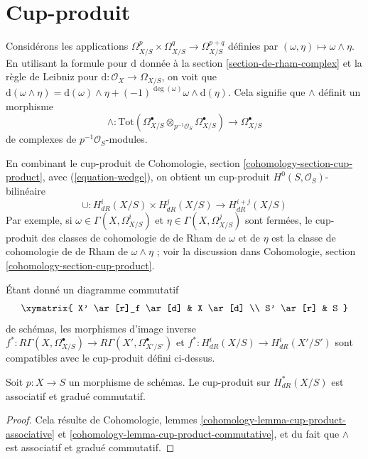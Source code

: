 \section{Cup-produit}
\label{section-cup-product}

\noindent
Considérons les applications
$\Omega^p_{X/S} \times \Omega^q_{X/S} \to \Omega^{p + q}_{X/S}$
définies par $(\omega , \eta) \longmapsto \omega \wedge \eta$.
En utilisant la formule pour $\text{d}$ donnée à la section \ref{section-de-rham-complex}
et la règle de Leibniz pour $\text{d} : \mathcal{O}_X \to \Omega_{X/S}$,
on voit que $\text{d}(\omega \wedge \eta) = \text{d}(\omega) \wedge \eta +
(-1)^{\deg(\omega)} \omega \wedge \text{d}(\eta)$. Cela signifie que
$\wedge$ définit un morphisme
\begin{equation}
\label{equation-wedge}
\wedge :
\text{Tot}(
\Omega^\bullet_{X/S} \otimes_{p^{-1}\mathcal{O}_S} \Omega^\bullet_{X/S})
\longrightarrow
\Omega^\bullet_{X/S}
\end{equation}
de complexes de $p^{-1}\mathcal{O}_S$-modules.

\medskip\noindent
En combinant le cup-produit de
Cohomologie, section \ref{cohomology-section-cup-product},
avec (\ref{equation-wedge}), on obtient un cup-produit
$H^0(S, \mathcal{O}_S)$-bilinéaire
$$
\cup : H^i_{dR}(X/S) \times H^j_{dR}(X/S) \longrightarrow H^{i + j}_{dR}(X/S)
$$
Par exemple, si $\omega \in \Gamma(X, \Omega^i_{X/S})$ et
$\eta \in \Gamma(X, \Omega^j_{X/S})$ sont fermées,
le cup-produit des classes de cohomologie de de Rham de
$\omega$ et de $\eta$ est la classe de cohomologie de de Rham de $\omega \wedge \eta$ ;
voir la discussion dans Cohomologie, section \ref{cohomology-section-cup-product}.

\medskip\noindent
Étant donné un diagramme commutatif
$$
\xymatrix{
X' \ar[r]_f \ar[d] & X \ar[d] \\
S' \ar[r] & S
}
$$
de schémas, les morphismes d'image inverse
$f^* : R\Gamma(X, \Omega^\bullet_{X/S}) \to R\Gamma(X', \Omega^\bullet_{X'/S'})$
et
$f^* : H^i_{dR}(X/S) \longrightarrow H^i_{dR}(X'/S')$
sont compatibles avec le cup-produit défini ci-dessus.

\begin{lemma}
\label{lemma-cup-product-graded-commutative}
Soit $p : X \to S$ un morphisme de schémas.
Le cup-produit sur $H^*_{dR}(X/S)$ est associatif et
gradué commutatif.
\end{lemma}

\begin{proof}
Cela résulte de
Cohomologie, lemmes \ref{cohomology-lemma-cup-product-associative} et
\ref{cohomology-lemma-cup-product-commutative},
et du fait que $\wedge$ est associatif et gradué commutatif.
\end{proof}

